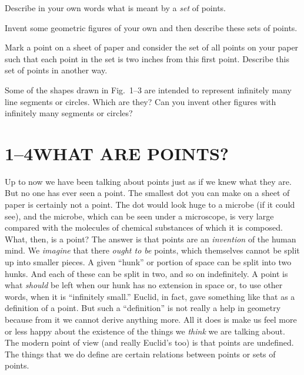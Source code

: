 \documentclass[11pt]{book}
\theoremstyle{bkplain}
\theoremstyle{XIplainnote}
\theoremstyle{bkplain}
\theoremstyle{bkplain}
\begin{document}
\begin{exercisecols}
\begin{exlist}
\item Describe in your own words what is meant by a \emph{set} of points.
\item Invent some geometric figures of your own and then describe these sets of
      points.
\item Mark a point on a sheet of paper and consider the set of all points on your
      paper such that each point in the set is two inches from this first point.
      Describe this set of points in another way.
\item Some of the shapes drawn in Fig.~1--3 are intended to represent infinitely
      many line segments or circles. Which are they? Can you invent other figures
      with infinitely many segments or circles?
\end{exlist}
\end{exercisecols}

\section*{1--4\quad WHAT ARE POINTS?}

Up to now we have been talking about points just as if we knew what they are. But
no one has ever seen a point. The smallest dot you can make on a sheet of paper
is certainly not a point. The dot would look huge to a microbe (if it could see),
and the microbe, which can be seen under a microscope, is very large compared
with the molecules of chemical substances of which it is composed. What, then, is
a point? The answer is that points are an \emph{invention} of the human mind. We
\emph{imagine} that there \emph{ought to be} points, which themselves cannot be
split up into smaller pieces. A given ``hunk'' or portion of space can be split
into two hunks. And each of these can be split in two, and so on indefinitely. A
point is what \emph{should} be left when our hunk has no extension in space or,
to use other words, when it is ``infinitely small.'' Euclid, in fact, gave
something like that as a definition of a point. But such a ``definition'' is not
really a help in geometry because from it we cannot derive anything more. All it
does is make us feel more or less happy about the existence of the things we
\emph{think} we are talking about. The modern point of view (and really Euclid's
too) is that points are undefined. The things that we do define are certain
relations between points or sets of points.
\end{document}
